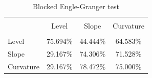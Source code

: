 \documentclass[12pt,bibliography=totoc]{article}
\begin{document}
\begin{table}[H]
\caption{Blocked Engle-Granger test} %

\centering%
\begin{tabular}{l | ccc}%
\hline\hline \\ [-1.5ex]                         %

	&	Level 	&	Slope	&	Curvature	\\
\hline \\ [-1.5ex]  
Level	&	75.694\%	&	44.444\%	&	64.583\%	\\
Slope	&	29.167\%	&	74.306\%	&	71.528\%	\\
Curvature	&	29.167\%	&	78.472\%	&	75.000\%	\\

\hline            
\end{tabular}
\label{table:nonlin}%
\end{table}


\newpage






\end{document}

